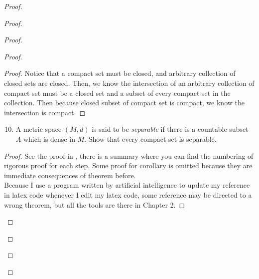 \documentclass{report}
\begin{document}
\begin{proof}
\begin{proof}
\begin{proof}
\begin{proof}
\begin{proof}
Notice that a compact set must be closed, and arbitrary collection of closed sets are closed. Then, we know the intersection of an arbitrary collection of compact set must be a closed set and a subset of every compact set in the collection. Then because closed subset of compact set is compact, we know the intersection is compact.
\end{proof}
\begin{question}{}{}
\begin{enumerate}
    \setcounter{enumi}{9}
    \item A metric space \( (M,d) \) is said to be \textit{separable} if there is a countable subset \( A \) which is dense in \( M \). Show that every compact set is separable.
\end{enumerate}
\end{question}
\begin{proof}
See the proof in , there is a summary where you can find the numbering of rigorous proof for each step. Some proof for corollary is omitted because they are immediate consequences of theorem before.\\

Because I use a program written by artificial intelligence to update my reference in latex code whenever I edit my latex code, some reference may be directed to a wrong theorem, but all the tools are there in Chapter 2. 
\end{proof}

\end{proof}
\end{proof}
\end{proof}
\end{proof}
\end{document}
